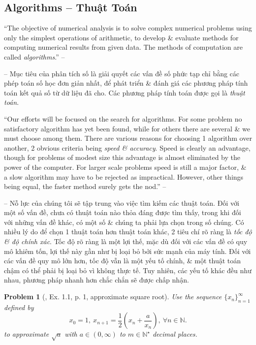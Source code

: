 \documentclass[oneside]{book}
\newtheorem{problem}{Problem}
\begin{document}
\subsection{Algorithms -- Thuật Toán}
``The objective of numerical analysis is to solve complex numerical problems using only the simplest operations of arithmetic, to develop \& evaluate methods for computing numerical results from given data. The methods of computation are called {\it algorithms}.'' -- \cite[p. 1]{Scheid1989}

-- Mục tiêu của phân tích số là giải quyết các vấn đề số phức tạp chỉ bằng các phép toán số học đơn giản nhất, để phát triển \& đánh giá các phương pháp tính toán kết quả số từ dữ liệu đã cho. Các phương pháp tính toán được gọi là {\it thuật toán}.

``Our efforts will be focused on the search for algorithms. For some problem no satisfactory algorithm has yet been found, while for others there are several \& we must choose among them. There are various reasons for choosing 1 algorithm over another, 2 obvious criteria being {\it speed \& accuracy}. Speed is clearly an advantage, though for problems of modest size this advantage is almost eliminated by the power of the computer. For larger scale problems speed is still a major factor, \& a slow algorithm may have to be rejected as impractical. However, other things being equal, the faster method surely gets the nod.'' -- \cite[p. 1]{Scheid1989}

-- Nỗ lực của chúng tôi sẽ tập trung vào việc tìm kiếm các thuật toán. Đối với một số vấn đề, chưa có thuật toán nào thỏa đáng được tìm thấy, trong khi đối với những vấn đề khác, có một số \& chúng ta phải lựa chọn trong số chúng. Có nhiều lý do để chọn 1 thuật toán hơn thuật toán khác, 2 tiêu chí rõ ràng là {\it tốc độ \& độ chính xác}. Tốc độ rõ ràng là một lợi thế, mặc dù đối với các vấn đề có quy mô khiêm tốn, lợi thế này gần như bị loại bỏ bởi sức mạnh của máy tính. Đối với các vấn đề quy mô lớn hơn, tốc độ vẫn là một yếu tố chính, \& một thuật toán chậm có thể phải bị loại bỏ vì không thực tế. Tuy nhiên, các yếu tố khác đều như nhau, phương pháp nhanh hơn chắc chắn sẽ được chấp nhận.

\begin{problem}[\cite{Scheid1989}, Ex. 1.1, p. 1, approximate square root]
	Use the sequence $\{x_n\}_{n=1}^\infty$ defined by
	\begin{equation*}
		x_0 = 1,\ x_{n+1} = \frac{1}{2}\left(x_n + \frac{a}{x_n}\right),\ \forall n\in\mathbb{N}.
	\end{equation*}
	to approximate $\sqrt{a}$ with $a\in(0,\infty)$ to $m\in\mathbb{N}^\star$ decimal places.
\end{problem}
\end{document}
